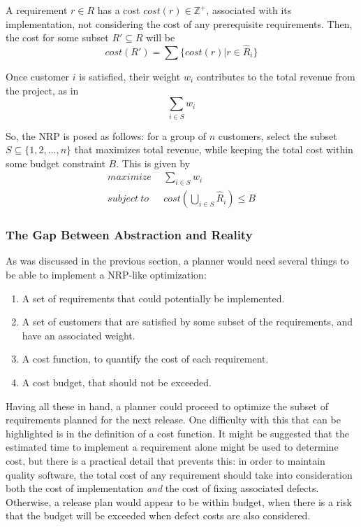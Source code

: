 \documentclass[a4paper]{scrartcl}
\begin{document}
A requirement $r \in R$ has a cost $cost(r) \in \mathbb{Z}^+$, associated with its implementation, not considering the cost of any prerequisite requirements. Then, the cost for some subset $R' \subseteq R$ will be
\begin{equation}
cost(R') = \sum \{cost(r) | r \in \hat{R}_i \}
\end{equation}

Once customer $i$ is satisfied, their weight $w_i$ contributes to the total revenue from the project, as in
\begin{equation}
\sum_{i \in S} w_i
\end{equation}

So, the NRP is posed as follows: for a group of $n$ customers, select the subset $S \subseteq \{ 1,2,...,n \}$ that maximizes total revenue, while keeping the total cost within some budget constraint $B$. This is given by 
\begin{equation}
\begin{split}
maximize~~& \sum_{i \in S} w_i \\
subject~to~~~& cost(\bigcup_{i \in S} \hat{R}_i) \le B
\end{split}
\end{equation}

\subsubsection*{The Gap Between Abstraction and Reality}
As was discussed in the previous section, a planner would need several things to be able to implement a NRP-like optimization:
\begin{enumerate}
\item{A set of requirements that could potentially be implemented.}
\item{A set of customers that are satisfied by some subset of the requirements, and have an associated weight.}
\item{A cost function, to quantify the cost of each requirement.}
\item{A cost budget, that should not be exceeded.}
\end{enumerate}

Having all these in hand, a planner could proceed to optimize the subset of requirements planned for the next release. One difficulty with this that can be highlighted is in the definition of a cost function. It might be suggested that the estimated time to implement a requirement alone might be used to determine cost, but there is a practical detail that prevents this: in order to maintain quality software, the total cost of any requirement should take into consideration both the cost of implementation \emph{and} the cost of fixing associated defects. Otherwise, a release plan would appear to be within budget, when there is a risk that the budget will be exceeded when defect costs are also considered.
\end{document}
